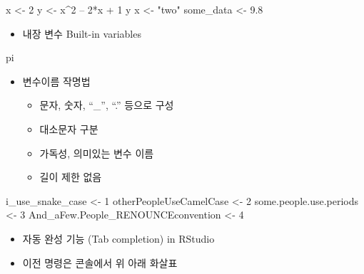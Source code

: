\documentclass[
]{book}
\newenvironment{Shaded}{\begin{snugshade}}{\end{snugshade}}
\newcommand{\DecValTok}[1]{\textcolor[rgb]{0.00,0.00,0.81}{#1}}
\newcommand{\FloatTok}[1]{\textcolor[rgb]{0.00,0.00,0.81}{#1}}
\newcommand{\NormalTok}[1]{#1}
\newcommand{\OtherTok}[1]{\textcolor[rgb]{0.56,0.35,0.01}{#1}}
\newcommand{\SpecialCharTok}[1]{\textcolor[rgb]{0.00,0.00,0.00}{#1}}
\newcommand{\StringTok}[1]{\textcolor[rgb]{0.31,0.60,0.02}{#1}}
\providecommand{\tightlist}{%
  \setlength{\itemsep}{0pt}\setlength{\parskip}{0pt}}
\begin{document}
\begin{Shaded}
\begin{Highlighting}[]
\NormalTok{x }\OtherTok{\textless{}{-}} \DecValTok{2}
\NormalTok{y }\OtherTok{\textless{}{-}}\NormalTok{ x}\SpecialCharTok{\^{}}\DecValTok{2}\NormalTok{ – }\DecValTok{2}\SpecialCharTok{*}\NormalTok{x }\SpecialCharTok{+} \DecValTok{1}
\NormalTok{y}
\NormalTok{x }\OtherTok{\textless{}{-}} \StringTok{"two"}  
\NormalTok{some\_data }\OtherTok{\textless{}{-}} \FloatTok{9.8}
\end{Highlighting}
\end{Shaded}

\begin{itemize}
\tightlist
\item
  내장 변수 Built-in variables
\end{itemize}

\begin{Shaded}
\begin{Highlighting}[]
\NormalTok{pi}
\end{Highlighting}
\end{Shaded}

\begin{itemize}
\tightlist
\item
  변수이름 작명법

  \begin{itemize}
  \tightlist
  \item
    문자, 숫자, ``\_'', ``.'' 등으로 구성
  \item
    대소문자 구분
  \item
    가독성, 의미있는 변수 이름
  \item
    길이 제한 없음
  \end{itemize}
\end{itemize}

\begin{Shaded}
\begin{Highlighting}[]
\NormalTok{i\_use\_snake\_case }\OtherTok{\textless{}{-}} \DecValTok{1}
\NormalTok{otherPeopleUseCamelCase }\OtherTok{\textless{}{-}} \DecValTok{2}
\NormalTok{some.people.use.periods }\OtherTok{\textless{}{-}} \DecValTok{3}
\NormalTok{And\_aFew.People\_RENOUNCEconvention }\OtherTok{\textless{}{-}} \DecValTok{4}
\end{Highlighting}
\end{Shaded}

\begin{itemize}
\tightlist
\item
  자동 완성 기능 (Tab completion) in RStudio
\item
  이전 명령은 콘솔에서 위 아래 화살표
\end{itemize}
\end{document}
